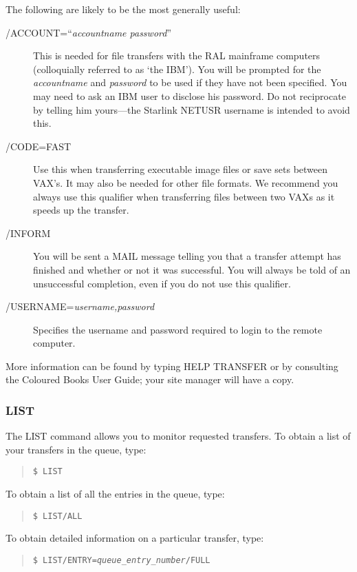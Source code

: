 The following are likely to be the most generally useful:
\begin{description}
\item[/ACCOUNT=``{\em accountname password\/}'']
\hspace{5mm} This is needed for file transfers with the RAL mainframe computers
(colloquially referred to as `the IBM').
You will be prompted for the {\em accountname} and {\em password} to be used if
they have not been specified.
You may need to ask an IBM user to disclose his password.
Do not reciprocate by telling him yours---the Starlink NETUSR username is
intended to avoid this.
\item[/CODE=FAST]
\hspace{5mm} Use this when transferring executable image files or save sets
between VAX's.
It may also be needed for other file formats.
We recommend you always use this qualifier when transferring files between
two VAXs as it speeds up the transfer.
\item[/INFORM]
\hspace{5mm} You will be sent a MAIL message telling you that a transfer attempt
has finished and whether or not it was successful.
You will always be told of an unsuccessful completion, even if you do not use
this qualifier.
\item[/USERNAME={\em username,password}]
\hspace{5mm} Specifies the username and password required to login to the
remote computer.
\end{description}
More information can be found by typing HELP TRANSFER or by consulting the
Coloured Books User Guide; your site manager will have a copy.
\subsubsection{LIST}
The LIST command allows you to monitor requested transfers.
To obtain a list of your transfers in the queue, type:
\begin{quote}
{\tt \$ LIST}
\end{quote}
To obtain a list of all the entries in the queue, type:
\begin{quote}
{\tt \$ LIST/ALL}
\end{quote}
To obtain detailed information on a particular transfer, type:
\begin{quote}
{\tt \$ LIST/ENTRY={\em queue\_entry\_number}/FULL}
\end{quote}
